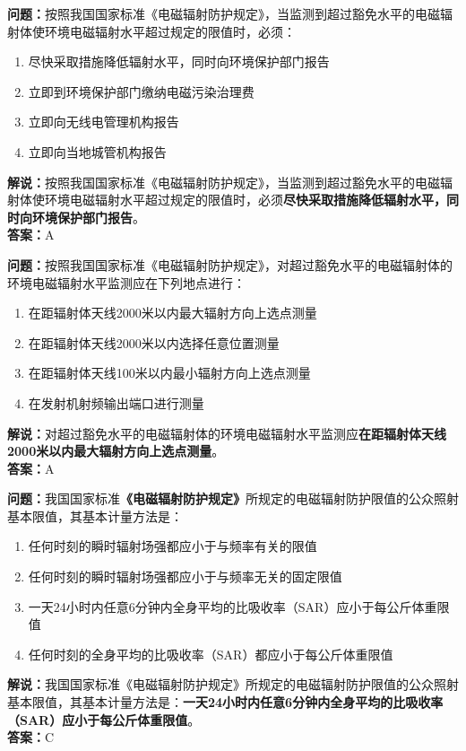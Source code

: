 \bigskip


\noindent\textbf{问题：}按照我国国家标准《电磁辐射防护规定》，当监测到超过豁免水平的电磁辐射体使环境电磁辐射水平超过规定的限值时，必须：
\begin{enumerate}[label=\Alph*), leftmargin=3em]
	\item 尽快采取措施降低辐射水平，同时向环境保护部门报告
	\item 立即到环境保护部门缴纳电磁污染治理费
	\item 立即向无线电管理机构报告
	\item 立即向当地城管机构报告
\end{enumerate}
\noindent\textbf{解说：}按照我国国家标准《电磁辐射防护规定》，当监测到超过豁免水平的电磁辐射体使环境电磁辐射水平超过规定的限值时，必须\textbf{尽快采取措施降低辐射水平，同时向环境保护部门报告}。\\\textbf{答案：}A

\bigskip


\noindent\textbf{问题：}按照我国国家标准《电磁辐射防护规定》，对超过豁免水平的电磁辐射体的环境电磁辐射水平监测应在下列地点进行：
\begin{enumerate}[label=\Alph*), leftmargin=3em]
	\item 在距辐射体天线2000米以内最大辐射方向上选点测量
	\item 在距辐射体天线2000米以内选择任意位置测量
	\item 在距辐射体天线100米以内最小辐射方向上选点测量
	\item 在发射机射频输出端口进行测量
\end{enumerate}
\noindent\textbf{解说：}对超过豁免水平的电磁辐射体的环境电磁辐射水平监测应\textbf{在距辐射体天线2000米以内最大辐射方向上选点测量}。\\\textbf{答案：}A

\bigskip


\noindent\textbf{问题：}我国国家标准\textbf{《电磁辐射防护规定》}所规定的电磁辐射防护限值的公众照射基本限值，其基本计量方法是：
\begin{enumerate}[label=\Alph*), leftmargin=3em]
	\item 任何时刻的瞬时辐射场强都应小于与频率有关的限值
	\item 任何时刻的瞬时辐射场强都应小于与频率无关的固定限值
	\item 一天24小时内任意6分钟内全身平均的比吸收率（SAR）应小于每公斤体重限值
	\item 任何时刻的全身平均的比吸收率（SAR）都应小于每公斤体重限值
\end{enumerate}
\noindent\textbf{解说：}我国国家标准《电磁辐射防护规定》所规定的电磁辐射防护限值的公众照射基本限值，其基本计量方法是：\textbf{一天24小时内任意6分钟内全身平均的比吸收率（SAR）应小于每公斤体重限值}。\\
\textbf{答案：}C


